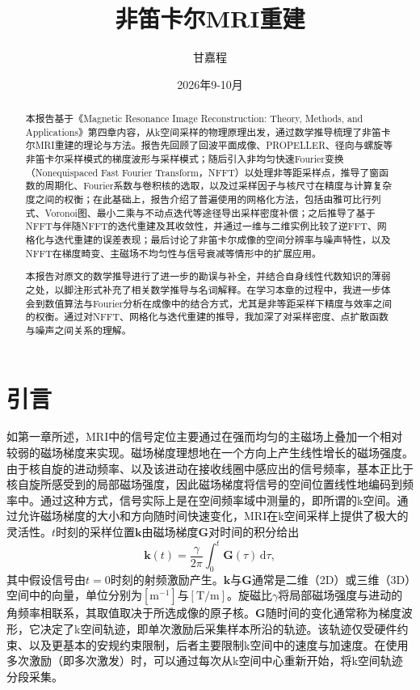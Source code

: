 \documentclass[12pt]{article}
\title{非笛卡尔MRI重建}
\author{甘嘉程}
\date{2026年9-10月}
\begin{document}
\maketitle

\begin{abstract}
本报告基于《Magnetic Resonance Image Reconstruction: Theory, Methods, and Applications》第四章内容，从k空间采样的物理原理出发，通过数学推导梳理了非笛卡尔MRI重建的理论与方法。报告先回顾了回波平面成像、PROPELLER、径向与螺旋等非笛卡尔采样模式的梯度波形与采样模式；随后引入非均匀快速Fourier变换（Nonequispaced Fast Fourier Transform，NFFT）以处理非等距采样点，推导了窗函数的周期化、Fourier系数与卷积核的选取，以及过采样因子与核尺寸在精度与计算复杂度之间的权衡；在此基础上，报告介绍了普遍使用的网格化方法，包括由雅可比行列式、Voronoi图、最小二乘与不动点迭代等途径导出采样密度补偿；之后推导了基于NFFT与伴随NFFT的迭代重建及其收敛性，并通过一维与二维实例比较了逆FFT、网格化与迭代重建的误差表现；最后讨论了非笛卡尔成像的空间分辨率与噪声特性，以及NFFT在梯度畸变、主磁场不均匀性与信号衰减等情形中的扩展应用。

本报告对原文的数学推导进行了进一步的勘误与补全，并结合自身线性代数知识的薄弱之处，以脚注形式补充了相关数学推导与名词解释。在学习本章的过程中，我进一步体会到数值算法与Fourier分析在成像中的结合方式，尤其是非等距采样下精度与效率之间的权衡。通过对NFFT、网格化与迭代重建的推导，我加深了对采样密度、点扩散函数与噪声之间关系的理解。
\end{abstract}

\section{引言}
如第一章所述，MRI中的信号定位主要通过在强而均匀的主磁场上叠加一个相对较弱的磁场梯度来实现。磁场梯度理想地在一个方向上产生线性增长的磁场强度。由于核自旋的进动频率、以及该进动在接收线圈中感应出的信号频率，基本正比于核自旋所感受到的局部磁场强度，因此磁场梯度将信号的空间位置线性地编码到频率中。通过这种方式，信号实际上是在空间频率域中测量的，即所谓的k空间。通过允许磁场梯度的大小和方向随时间快速变化，MRI在k空间采样上提供了极大的灵活性。$t$时刻的采样位置$\bm{k}$由磁场梯度$\bm{G}$对时间的积分给出
\begin{equation}
    \bm{k}(t)=\frac{\gamma}{2\pi}\int_{0}^{t}\bm{G}(\tau)\,\mathrm{d}\tau,
    \label{equ:4.1}
\end{equation}
其中假设信号由$t=0$时刻的射频激励产生。$\bm{k}$与$\bm{G}$通常是二维（2D）或三维（3D）空间中的向量，单位分别为$[\mathrm{m}^{-1}]$与$[\mathrm{T}/\mathrm{m}]$。旋磁比$\gamma$将局部磁场强度与进动的角频率相联系，其取值取决于所选成像的原子核。$\bm{G}$随时间的变化通常称为梯度波形，它决定了k空间轨迹，即单次激励后采集样本所沿的轨迹。该轨迹仅受硬件约束、以及更基本的安规约束限制，后者主要限制k空间中的速度与加速度。在使用多次激励（即多次激发）时，可以通过每次从k空间中心重新开始，将k空间轨迹分段采集。
\end{document}
